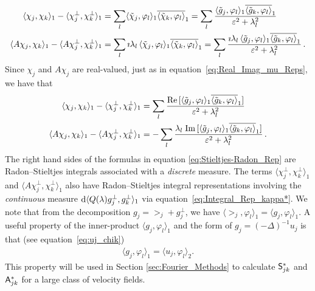 \documentclass[amsa]{ipart}
\begin{document}
%
\begin{align}%
  \langle\chi_j,\chi_k\rangle_1-\langle\chi_j^\perp,\chi_k^\perp\rangle_1&=\sum_l\langle\chit_j,\varphi_l\rangle_1\overline{\langle\chit_k,\varphi_l\rangle}_1
         =\sum_l\frac{\langle\gt_j,\varphi_l\rangle_1\overline{\langle\gt_k,\varphi_l\rangle}_1}{\varepsilon^2+\lambda_l^2}
         \\
  \langle A\chi_j,\chi_k\rangle_1-\langle A\chi_j^\perp,\chi_k^\perp\rangle_1&=\sum_l\imath\lambda_l\,\langle\chit_j,\varphi_l\rangle_1\overline{\langle\chit_k,\varphi_l\rangle}_1
         =\sum_l\frac{\imath\lambda_l\,\langle\gt_j,\varphi_l\rangle_1\overline{\langle\gt_k,\varphi_l\rangle}_1}{\varepsilon^2+\lambda_l^2}\,.
         \notag
\end{align}
%
Since $\chi_j$ and $A\chi_j$ are real-valued, just as in
equation~\eqref{eq:Real_Imag_mu_Reps}, we have that
%
\begin{align}\label{eq:Stieltjes-Radon_Rep}
  \langle\chi_j,\chi_k\rangle_1-\langle\chi_j^\perp,\chi_k^\perp\rangle_1&=\sum_l\frac{\Real[\langle\gt_j,\varphi_l\rangle_1\overline{\langle\gt_k,\varphi_l\rangle}_1]}{\varepsilon^2+\lambda_l^2}
         \\
  \langle A\chi_j,\chi_k\rangle_1-\langle A\chi_j^\perp,\chi_k^\perp\rangle_1&=-\sum_l\frac{\lambda_l\;\Imag[\langle\gt_j,\varphi_l\rangle_1\overline{\langle\gt_k,\varphi_l\rangle}_1]}{\varepsilon^2+\lambda_l^2}\,.
         \notag
\end{align}
%
The right hand sides of the formulas in equation
\eqref{eq:Stieltjes-Radon_Rep} are Radon--Stieltjes integrals
associated with a \emph{discrete} measure. The terms $\langle\chi_j^\perp,\chi_k^\perp\rangle_1$ and
$\langle A\chi_j^\perp,\chi_k^\perp\rangle_1$ also have Radon--Stieltjes integral representations
involving the \emph{continuous} measure $\mathrm{d}\langle Q(\lambda)g_j^\perp,g_k^\perp\rangle_1$
via equation~\eqref{eq:Integral_Rep_kappa*}. We note that from the 
decomposition $g_j=\gt_j+g^\perp_j$, we have
$\langle\gt_j,\varphi_l\rangle_1=\langle g_j,\varphi_l\rangle_1$. A useful property of the inner-product
$\langle g_j,\varphi_l\rangle_1$ and the form of $g_j=(-\Delta)^{-1}u_j$ is that (see equation~\eqref{eq:uj_chik})
%
\begin{align}\label{eq:H1_L2}
  \langle g_j,\varphi_l\rangle_1=\langle u_j,\varphi_l\rangle_2.
\end{align}
%
This property will
be used in Section \ref{sec:Fourier_Methods} to calculate $\mathsf{S}^*_{jk}$
and $\mathsf{A}^*_{jk}$ for a large class of velocity fields.   
\end{document}
